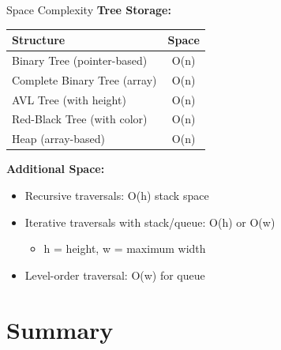\documentclass[aspectratio=169]{beamer}
\begin{document}
\begin{frame}{Space Complexity}
  \textbf{Tree Storage:}

  \vspace{0.3cm}
  \begin{table}
    \centering
    \begin{tabular}{|l|c|}
      \hline
      \textbf{Structure} & \textbf{Space} \\
      \hline
      Binary Tree (pointer-based) & O(n) \\
      \hline
      Complete Binary Tree (array) & O(n) \\
      \hline
      AVL Tree (with height) & O(n) \\
      \hline
      Red-Black Tree (with color) & O(n) \\
      \hline
      Heap (array-based) & O(n) \\
      \hline
    \end{tabular}
  \end{table}

  \vspace{0.3cm}
  \textbf{Additional Space:}
  \begin{itemize}
    \item Recursive traversals: O(h) stack space
    \item Iterative traversals with stack/queue: O(h) or O(w)
      \begin{itemize}
        \item h = height, w = maximum width
      \end{itemize}
    \item Level-order traversal: O(w) for queue
  \end{itemize}
\end{frame}

\section{Summary}
\end{document}
